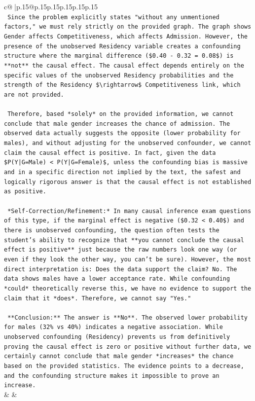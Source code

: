 \documentclass{article}
\begin{document}
{\begin{supertabular}{c@{$\;$}|p{.15\linewidth}@{}p{.15\linewidth}p{.15\linewidth}p{.15\linewidth}p{.15\linewidth}p{.15\linewidth}}
{{{\\ 
\texttt{    Since the problem explicitly states "without any unmentioned factors," we must rely strictly on the provided graph. The graph shows Gender affects Competitiveness, which affects Admission. However, the presence of the unobserved Residency variable creates a confounding structure where the marginal difference (\$0.40 {-} 0.32 = 0.08\$) is **not** the causal effect. The causal effect depends entirely on the specific values of the unobserved Residency probabilities and the strength of the Residency \$\textbackslash{}rightarrow\$ Competitiveness link, which are not provided.} \\
\\ 
\texttt{    Therefore, based *solely* on the provided information, we cannot conclude that male gender increases the chance of admission. The observed data actually suggests the opposite (lower probability for males), and without adjusting for the unobserved confounder, we cannot claim the causal effect is positive. In fact, given the data \$P(Y|G=Male) < P(Y|G=Female)\$, unless the confounding bias is massive and in a specific direction not implied by the text, the safest and logically rigorous answer is that the causal effect is not established as positive.} \\
\\ 
\texttt{    *Self{-}Correction/Refinement:* In many causal inference exam questions of this type, if the marginal effect is negative (\$0.32 < 0.40\$) and there is unobserved confounding, the question often tests the student's ability to recognize that **you cannot conclude the causal effect is positive** just because the raw numbers look one way (or even if they look the other way, you can't be sure). However, the most direct interpretation is: Does the data support the claim? No. The data shows males have a lower acceptance rate. While confounding *could* theoretically reverse this, we have no evidence to support the claim that it *does*. Therefore, we cannot say "Yes."} \\
\\ 
\texttt{    **Conclusion:** The answer is **No**. The observed lower probability for males (32\% vs 40\%) indicates a negative association. While unobserved confounding (Residency) prevents us from definitively proving the causal effect is zero or positive without further data, we certainly cannot conclude that male gender *increases* the chance based on the provided statistics. The evidence points to a decrease, and the confounding structure makes it impossible to prove an increase.} \\
            }
        }
    }
    & & \\ \\


\end{supertabular}}
\end{document}
